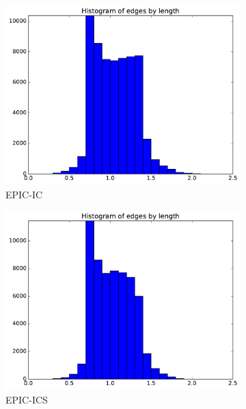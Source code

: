 \documentclass[3p,times,procedia,number]{elsarticle}
\begin{document}
\begin{figure}
\begin{subfigure}{.4\textwidth}
\centering
\includegraphics[width=\textwidth]{epic-ic-cube-linear-length.pdf}
\caption{EPIC-IC}
\end{subfigure}
\begin{subfigure}{.4\textwidth}
\centering
\includegraphics[width=\textwidth]{epic-ics-cube-linear-length.pdf}
\caption{EPIC-ICS}
\end{subfigure}
\begin{subfigure}{.4\textwidth}
\centering

\end{subfigure}
\end{figure}
\end{document}
